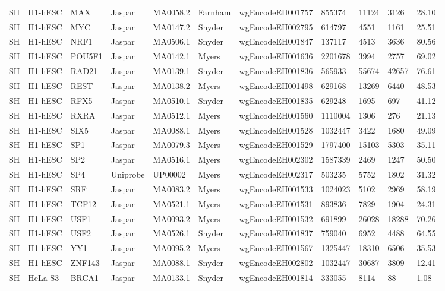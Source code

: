 {\begin{longtable}{p{0.2cm}p{1.1cm}p{1.0cm}p{1.0cm}p{1.0cm}p{1.0cm}p{2.3cm}p{1.0cm}p{0.8cm}p{0.8cm}p{0.8cm}}
SH & H1-hESC & MAX & Jaspar & MA0058.2 & Farnham & wgEncodeEH001757 & 855374 & 11124 & 3126 & 28.10\\
SH & H1-hESC & MYC & Jaspar & MA0147.2 & Snyder & wgEncodeEH002795 & 614797 & 4551 & 1161 & 25.51\\
SH & H1-hESC & NRF1 & Jaspar & MA0506.1 & Snyder & wgEncodeEH001847 & 137117 & 4513 & 3636 & 80.56\\
SH & H1-hESC & POU5F1 & Jaspar & MA0142.1 & Myers & wgEncodeEH001636 & 2201678 & 3994 & 2757 & 69.02\\
SH & H1-hESC & RAD21 & Jaspar & MA0139.1 & Snyder & wgEncodeEH001836 & 565933 & 55674 & 42657 & 76.61\\
SH & H1-hESC & REST & Jaspar & MA0138.2 & Myers & wgEncodeEH001498 & 629168 & 13269 & 6440 & 48.53\\
SH & H1-hESC & RFX5 & Jaspar & MA0510.1 & Snyder & wgEncodeEH001835 & 629248 & 1695 & 697 & 41.12\\
SH & H1-hESC & RXRA & Jaspar & MA0512.1 & Myers & wgEncodeEH001560 & 1110004 & 1306 & 276 & 21.13\\
SH & H1-hESC & SIX5 & Jaspar & MA0088.1 & Myers & wgEncodeEH001528 & 1032447 & 3422 & 1680 & 49.09\\
SH & H1-hESC & SP1 & Jaspar & MA0079.3 & Myers & wgEncodeEH001529 & 1797400 & 15103 & 5303 & 35.11\\
SH & H1-hESC & SP2 & Jaspar & MA0516.1 & Myers & wgEncodeEH002302 & 1587339 & 2469 & 1247 & 50.50\\
SH & H1-hESC & SP4 & Uniprobe & UP00002 & Myers & wgEncodeEH002317 & 503235 & 5752 & 1802 & 31.32\\
SH & H1-hESC & SRF & Jaspar & MA0083.2 & Myers & wgEncodeEH001533 & 1024023 & 5102 & 2969 & 58.19\\
SH & H1-hESC & TCF12 & Jaspar & MA0521.1 & Myers & wgEncodeEH001531 & 893836 & 7829 & 1904 & 24.31\\
SH & H1-hESC & USF1 & Jaspar & MA0093.2 & Myers & wgEncodeEH001532 & 691899 & 26028 & 18288 & 70.26\\
SH & H1-hESC & USF2 & Jaspar & MA0526.1 & Snyder & wgEncodeEH001837 & 759040 & 6952 & 4488 & 64.55\\
SH & H1-hESC & YY1 & Jaspar & MA0095.2 & Myers & wgEncodeEH001567 & 1325447 & 18310 & 6506 & 35.53\\
SH & H1-hESC & ZNF143 & Jaspar & MA0088.1 & Snyder & wgEncodeEH002802 & 1032447 & 30687 & 3809 & 12.41\\
SH & HeLa-S3 & BRCA1 & Jaspar & MA0133.1 & Snyder & wgEncodeEH001814 & 333055 & 8114 & 88 & 1.08\\

\end{longtable}}
